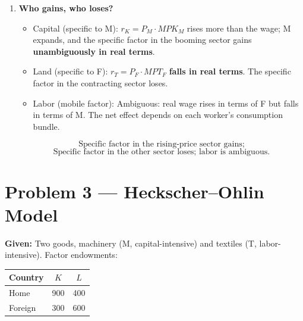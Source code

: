 \documentclass[12pt]{article}
\begin{document}
\begin{enumerate}[label=(\arabic*)]
\item \textbf{Who gains, who loses?}

\begin{itemize}
\item Capital (specific to M):  
  $r_K = P_M \cdot MPK_M$ rises more than the wage; M expands, and the specific factor in the booming sector gains \textbf{unambiguously in real terms}.
\item Land (specific to F):  
  $r_T = P_F \cdot MPT_F$ \textbf{falls in real terms}. The specific factor in the contracting sector loses.
\item Labor (mobile factor):  
  Ambiguous: real wage rises in terms of F but falls in terms of M. The net effect depends on each worker's consumption bundle.
\end{itemize}

\[
\boxed{\text{Specific factor in the rising-price sector gains;}}
\]
\[
\boxed{\text{Specific factor in the other sector loses; labor is ambiguous.}}
\]
\end{enumerate}

\section*{Problem 3 — Heckscher--Ohlin Model}

\textbf{Given:} Two goods, machinery (M, capital-intensive) and textiles (T, labor-intensive).  
Factor endowments:

\begin{center}
\begin{tabular}{lcc}
\toprule
Country & $K$ & $L$ \\
\midrule
Home    & 900 & 400 \\
Foreign & 300 & 600 \\
\bottomrule
\end{tabular}
\end{center}
\end{document}
